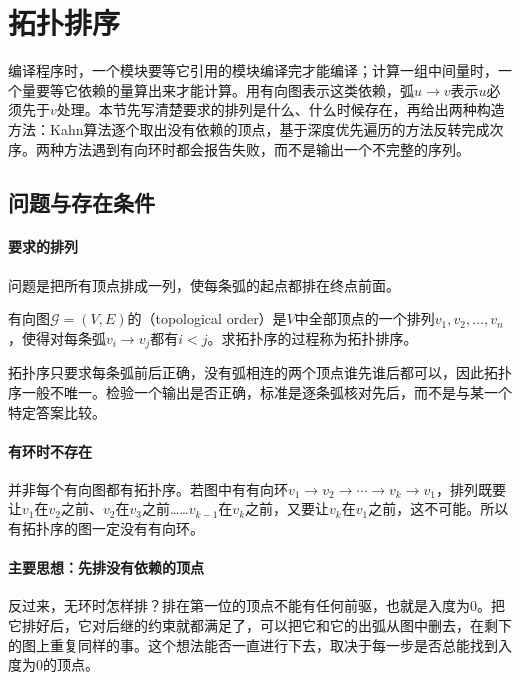 \section{拓扑排序}
\label{sec:graph-topological-order}

编译程序时，一个模块要等它引用的模块编译完才能编译；计算一组中间量时，一个量要等它依赖的量算出来才能计算。用有向图表示这类依赖，弧$u\to v$表示$u$必须先于$v$处理。本节先写清楚要求的排列是什么、什么时候存在，再给出两种构造方法：Kahn算法逐个取出没有依赖的顶点，基于深度优先遍历的方法反转完成次序。两种方法遇到有向环时都会报告失败，而不是输出一个不完整的序列。

\subsection{问题与存在条件}
\label{sec:graph-trav-topo-problem}

\paragraph{要求的排列}
问题是把所有顶点排成一列，使每条弧的起点都排在终点前面。

\begin{definition}[拓扑序]
\label{def:graph-trav-topological-order}
有向图$\mathcal G=(V,E)$的（topological order）是$V$中全部顶点的一个排列$v_1,v_2,\ldots,v_n$，使得对每条弧$v_i\to v_j$都有$i<j$。求拓扑序的过程称为拓扑排序。
\end{definition}

拓扑序只要求每条弧前后正确，没有弧相连的两个顶点谁先谁后都可以，因此拓扑序一般不唯一。检验一个输出是否正确，标准是逐条弧核对先后，而不是与某一个特定答案比较。

\paragraph{有环时不存在}
并非每个有向图都有拓扑序。若图中有有向环$v_1\to v_2\to\cdots\to v_k\to v_1$，排列既要让$v_1$在$v_2$之前、$v_2$在$v_3$之前……$v_{k-1}$在$v_k$之前，又要让$v_k$在$v_1$之前，这不可能。所以有拓扑序的图一定没有有向环。

\paragraph{主要思想：先排没有依赖的顶点}
反过来，无环时怎样排？排在第一位的顶点不能有任何前驱，也就是入度为$0$。把它排好后，它对后继的约束就都满足了，可以把它和它的出弧从图中删去，在剩下的图上重复同样的事。这个想法能否一直进行下去，取决于每一步是否总能找到入度为$0$的顶点。

